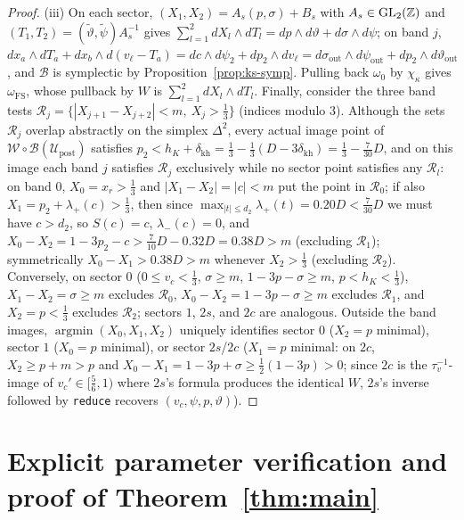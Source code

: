 \begin{proof}
(iii) On each sector, $(X_1,X_2)=A_s(p,\sigma)+B_s$ with $A_s\in\mathrm{GL}_2(\mathbb{Z})$ and
$(T_1,T_2)=(\tilde\vartheta,\tilde\psi)A_s^{-1}$ gives $\sum_{l=1}^2 dX_l\wedge dT_l=dp\wedge d\vartheta+d\sigma\wedge d\psi$;
on band $j$, $dx_a\wedge dT_a+dx_b\wedge d(v_\ell-T_a)=dc\wedge d\psi_2+dp_2\wedge dv_\ell
=d\sigma_{\mathrm{out}}\wedge d\psi_{\mathrm{out}}+dp_2\wedge d\vartheta_{\mathrm{out}}$, and $\mathcal B$ is symplectic
by Proposition~\ref{prop:ks-symp}. Pulling back $\omega_0$ by $\chi_\kappa$ gives $\omega_{\mathrm{FS}}$, whose pullback
by $W$ is $\sum_{l=1}^2dX_l\wedge dT_l$. Finally, consider the three band tests $\mathcal R_j=\{|X_{j+1}-X_{j+2}|<m,\ X_j>\frac13\}$
(indices modulo $3$). Although the sets $\mathcal R_j$ overlap abstractly on the simplex $\Delta^2$, every actual image
point of $\mathcal W\circ\mathcal B(\mathcal U_{\mathrm{post}})$ satisfies $p_2<h_K+\delta_{\mathrm{kh}}=\frac13-\frac13(D-3\delta_{\mathrm{kh}})=\frac13-\frac7{30}D$,
and on this image each band $j$ satisfies $\mathcal R_j$ exclusively while no sector point satisfies any $\mathcal R_l$:
on band $0$, $X_0=x_r>\frac13$ and $|X_1-X_2|=|c|<m$ put the point in $\mathcal R_0$; if also $X_1=p_2+\lambda_+(c)>\frac13$,
then since $\max_{|t|\le d_2}\lambda_+(t)=0.20D<\frac7{30}D$ we must have $c>d_2$, so $S(c)=c$, $\lambda_-(c)=0$, and
$X_0-X_2=1-3p_2-c>\frac7{10}D-0.32D=0.38D>m$ (excluding $\mathcal R_1$); symmetrically $X_0-X_1>0.38D>m$ whenever $X_2>\frac13$
(excluding $\mathcal R_2$). Conversely, on sector $0$ ($0\le v_c<\frac13$, $\sigma\ge m$, $1-3p-\sigma\ge m$, $p<h_K<\frac13$),
$X_1-X_2=\sigma\ge m$ excludes $\mathcal R_0$, $X_0-X_2=1-3p-\sigma\ge m$ excludes $\mathcal R_1$, and $X_2=p<\frac13$
excludes $\mathcal R_2$; sectors $1$, $2s$, and $2c$ are analogous. Outside the band images, $\operatorname{argmin}(X_0,X_1,X_2)$
uniquely identifies sector $0$ ($X_2=p$ minimal), sector $1$ ($X_0=p$ minimal), or sector $2s$/$2c$ ($X_1=p$ minimal:
on $2c$, $X_2\ge p+m>p$ and $X_0-X_1=1-3p+\sigma\ge\frac12(1-3p)>0$; since $2c$ is the $\tau_v^{-1}$-image of
$v_c'\in[\frac56,1)$ where $2s$'s formula produces the identical $W$, $2s$'s inverse followed by \texttt{reduce} recovers
$(v_c,\psi,p,\vartheta)$).
\end{proof}

\section{Explicit parameter verification and proof of Theorem~\ref{thm:main}}\label{sec:assembly}

